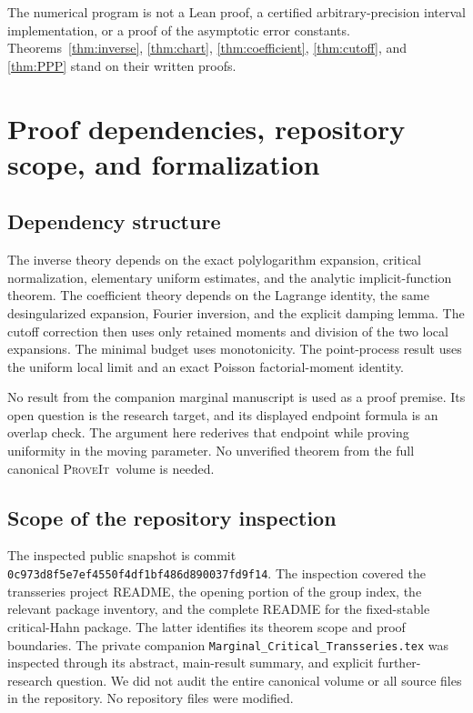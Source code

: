 \documentclass[11pt,a4paper]{article}
\numberwithin{equation}{section}
\theoremstyle{definition}
\theoremstyle{remark}
\newcommand{\repo}{\textsc{ProveIt}}
\begin{document}
The numerical program is not a Lean proof, a certified arbitrary-precision
interval implementation, or a proof of the asymptotic error constants.
Theorems~\ref{thm:inverse}, \ref{thm:chart}, \ref{thm:coefficient},
\ref{thm:cutoff}, and \ref{thm:PPP} stand on their written proofs.

\section{Proof dependencies, repository scope, and formalization}
\label{sec:audit}

\subsection{Dependency structure}
The inverse theory depends on the exact polylogarithm expansion, critical
normalization, elementary uniform estimates, and the analytic
implicit-function theorem. The coefficient theory depends on the Lagrange
identity, the same desingularized expansion, Fourier inversion, and the
explicit damping lemma. The cutoff correction then uses only retained
moments and division of the two local expansions. The minimal budget uses
monotonicity. The point-process result uses the uniform local limit and
an exact Poisson factorial-moment identity.

No result from the companion marginal manuscript is used as a proof premise.
Its open question is the research target, and its displayed endpoint formula
is an overlap check. The argument here rederives that endpoint while proving
uniformity in the moving parameter. No unverified theorem from the full
canonical \repo\ volume is needed.

\subsection{Scope of the repository inspection}
The inspected public snapshot is commit
\texttt{0c973d8f5e7ef4550f4df1bf486d890037fd9f14}.
The inspection covered the transseries project README, the opening portion
of the group index, the relevant package inventory, and the complete README
for the fixed-stable critical-Hahn package. The latter identifies its theorem
scope and proof boundaries. The private companion
\texttt{Marginal\_Critical\_Transseries.tex} was inspected through its abstract,
main-result summary, and explicit further-research question. We did not audit
the entire canonical volume or all source files in the repository. No
repository files were modified.
\end{document}
